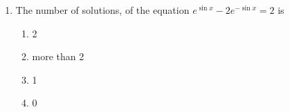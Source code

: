 \documentclass[journal]{IEEEtran}
\numberwithin{equation}{enumi}
\numberwithin{figure}{enumi}
\begin{document}
\begin{enumerate}
\begin{multicols}{4}
\begin{enumerate}
        \item 0
        \item 3
        \item 1
        \item 2
    \end{enumerate} 
    \end{multicols}
    \bigskip
    \item The number of solutions, of the equation $e^{\sin
    {x}} - 2e^{-\sin{x}} = 2$ is
    \begin{multicols}{4}
    \begin{enumerate}
        \item 2
        \item more than 2
        \item 1
        \item 0
    \end{enumerate} 
    \end{multicols}
    \bigskip

\end{enumerate}
\end{document}
